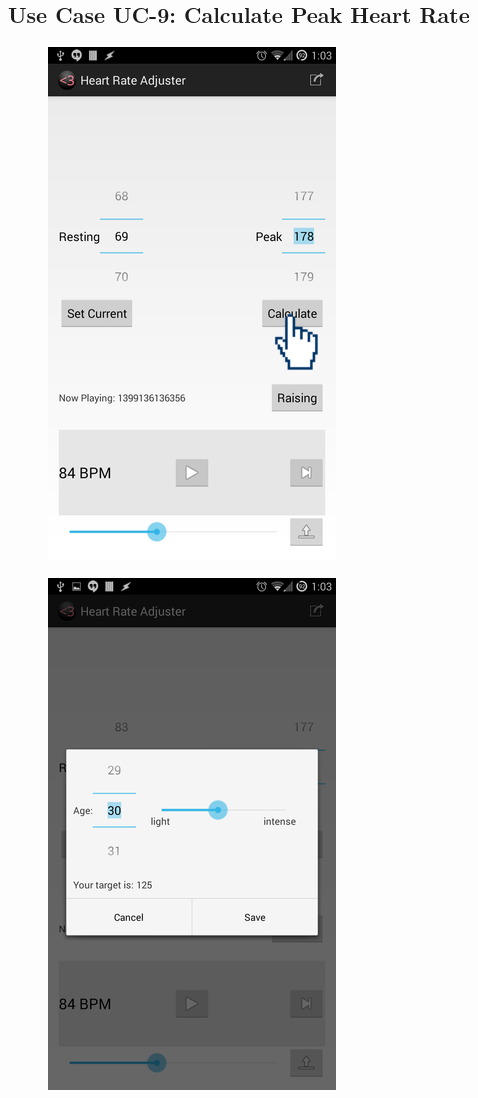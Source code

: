 \documentclass[letterpaper,english, 12pt]{scrreprt}
\begin{document}
\subsection{Use Case UC-9: Calculate Peak Heart Rate}
\begin{figure}[H]
	\centering
	\includegraphics{img/Prelim_Design/11.png}
\end{figure}
\begin{figure}[H]
	\centering
	\includegraphics{img/Prelim_Design/3.png}
\end{figure}
\end{document}
